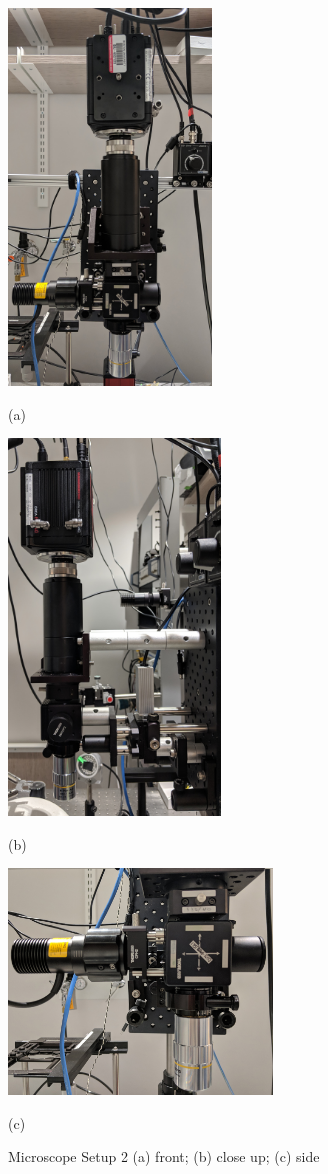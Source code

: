 \begin{figure}[htb]
	\begin{minipage}[t]{0.45\linewidth}\centering
		\includegraphics[height=10cm]{2_body/figures/setup3-front.jpg}
		\centerline{(a)}
	\end{minipage}
	\hfill
	\begin{minipage}[t]{0.45\linewidth}\centering
		\includegraphics[height=10cm]{2_body/figures/setup3-side.jpg}
		\centerline{(b)}
	\end{minipage}
	\begin{minipage}[t]{\linewidth}\centering
		\includegraphics[width=7cm]{2_body/figures/setup3-closeup.jpg}
		\centerline{(c)}
	\end{minipage}
	\caption{
		Microscope Setup 2 (a) front;
		(b) close up; (c) side}
	\label{fig:motion sensors}
\end{figure}

